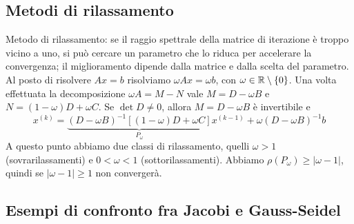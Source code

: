 \documentclass[a4paper]{article}
\begin{document}
\subsection{Metodi di rilassamento}

Metodo di rilassamento:
se il raggio spettrale della matrice di iterazione è troppo vicino a uno, si può cercare un parametro che lo riduca per accelerare la convergenza; il miglioramento dipende dalla matrice e dalla scelta del parametro. Al posto di risolvere \(Ax = b\)
risolviamo \(\omega Ax = \omega b\), con \(\omega\in\mathbb{R}\setminus\{0\}\).
Una volta effettuata la decomposizione \(\omega A = M - N\)
vale
\(M = D-\omega B\) e \(N = (1-\omega) D + \omega C\).
Se \(\det D\neq 0\), allora \(M=D-\omega B\) è invertibile e \[
    x^{(k)} = \underbrace{(D-\omega B)^{-1} \left[
            (1-\omega) D + \omega C
    \right]}_{P_\omega}
    x^{(k-1)} + \omega(D - \omega B)^{-1}b
\]
A questo punto abbiamo due classi di rilassamento, quelli \(\omega > 1\) (sovrarilassamenti)
e \(0<\omega < 1\) (sottorilassamenti).
Abbiamo \(\rho(P_\omega) \geq |\omega-1|\),
quindi se \(|\omega-1| \geq 1\) non convergerà.

\subsection{Esempi di confronto fra Jacobi e Gauss-Seidel}
\end{document}
